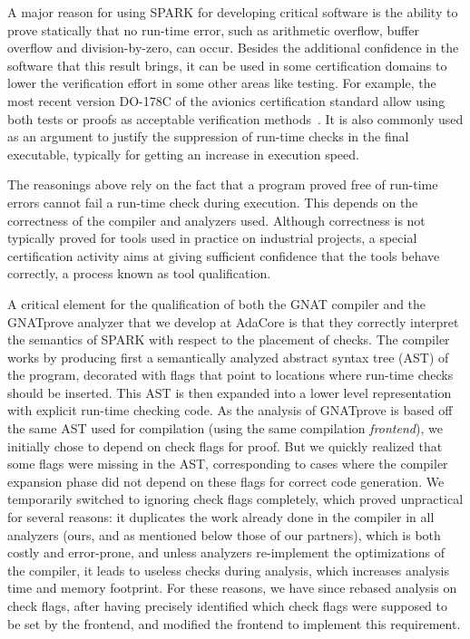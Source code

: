 A major reason for using SPARK for developing critical software is the ability
to prove statically that no run-time error, such as arithmetic overflow, buffer
overflow and division-by-zero, can occur. Besides the additional confidence in
the software that this result brings, it can be used in some certification
domains to lower the verification effort in some other areas like testing. For
example, the most recent version DO-178C of the avionics certification standard
allow using both tests or proofs as acceptable verification
methods~\cite{ieeesoftware2013}. It is also commonly used as an argument to
justify the suppression of run-time checks in the final executable, typically
for getting an increase in execution speed.

The reasonings above rely on the fact that a program proved free of run-time
errors cannot fail a run-time check during execution. This depends on the
correctness of the compiler and analyzers used. Although correctness is not
typically proved for tools used in practice on industrial projects, a special
certification activity aims at giving sufficient confidence that the tools
behave correctly, a process known as tool qualification.

A critical element for the qualification of both the GNAT compiler and the
GNATprove analyzer that we develop at AdaCore is that they correctly interpret
the semantics of SPARK with respect to the placement of checks. The compiler
works by producing first a semantically analyzed abstract syntax tree (AST) of
the program, decorated with flags that point to locations where run-time checks
should be inserted. This AST is then expanded into a lower level representation
with explicit run-time checking code. As the analysis of GNATprove is based off
the same AST used for compilation (using the same compilation
\textit{frontend}), we initially chose to depend on check flags for proof. But
we quickly realized that some flags were missing in the AST, corresponding to
cases where the compiler expansion phase did not depend on these flags for
correct code generation. We temporarily switched to ignoring check flags
completely, which proved unpractical for several reasons: it duplicates the
work already done in the compiler in all analyzers (ours, and as mentioned
below those of our partners), which is both costly and error-prone, and unless
analyzers re-implement the optimizations of the compiler, it leads to useless
checks during analysis, which increases analysis time and memory footprint. For
these reasons, we have since rebased analysis on check flags, after having
precisely identified which check flags were supposed to be set by the frontend,
and modified the frontend to implement this requirement.


